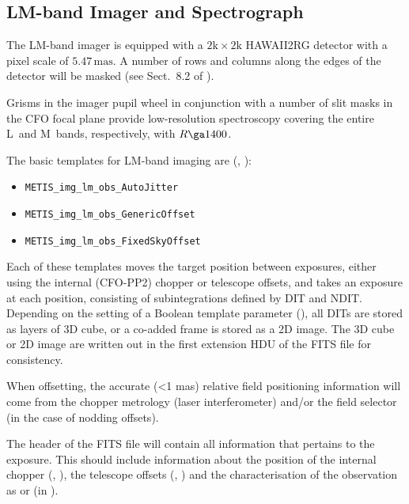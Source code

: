 
\subsection{LM-band Imager and Spectrograph}
\label{ssec:instrument_data_LM-IMG}

The LM-band imager is equipped with a $2\mathrm{k}\times2\mathrm{k}$
HAWAII2RG detector with a pixel scale of $5.47\,\mathrm{mas}$. A
number of rows and columns along the edges of the detector will be
masked (see Sect.~8.2 of \cite{DRLS}).

Grisms in the imager pupil wheel in conjunction with a number of slit
masks in the CFO focal plane provide low-resolution spectroscopy
covering the entire L~and M~bands, respectively, with $R\ga 1400$.

The basic templates for LM-band imaging are
(\cite{METIS-operational_concept}, \cite{METIS-template_manual}):
\begin{itemize}
\item \lstinline{METIS_img_lm_obs_AutoJitter}
\item \lstinline{METIS_img_lm_obs_GenericOffset}
\item \lstinline{METIS_img_lm_obs_FixedSkyOffset}
\end{itemize}

Each of these templates moves the target position between exposures,
either using the internal (CFO-PP2) chopper or telescope offsets, and
takes an exposure at each position, consisting of subintegrations
defined by DIT and NDIT. Depending on the setting of a Boolean
template parameter (), all DITs are stored as
layers of 3D cube, or a co-added frame is stored as a 2D image.
The 3D cube or 2D image are written out in the first extension HDU of the FITS file for consistency.

When offsetting, the accurate (<1 mas) relative field positioning information will come from the chopper metrology (laser interferometer) and/or the field selector (in the case of nodding offsets).

The header of the FITS file will contain all information that pertains
to the exposure. This should include information about the position of
the internal chopper (,
), the telescope offsets (,
) and the characterisation of the observation as
 or  (in ).

